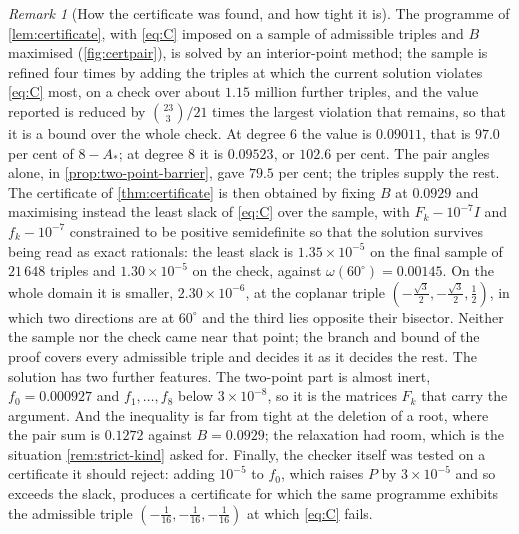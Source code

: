\documentclass[11pt,reqno]{amsart}
\renewcommand{\_}{\origunderscore\allowbreak}
\numberwithin{equation}{section}
\theoremstyle{plain}
\theoremstyle{definition}
\theoremstyle{remark}
\newtheorem{remark}[thm]{Remark}
\begin{document}
\begin{remark}[How the certificate was found, and how tight it is]\label{rem:certificate-found}
The programme of \cref{lem:certificate}, with \eqref{eq:C} imposed on a
sample of admissible triples and $B$ maximised
(\cref{fig:certpair}), is solved by an
interior-point method; the sample is
refined four times by adding the triples at which the current solution
violates \eqref{eq:C} most, on a check over about $1.15$ million further
triples, and the value reported is reduced by $\binom{23}3/21$ times
the largest violation that remains, so that it is a bound over the
whole check. At degree $6$ the value is $0.09011$, that is $97.0$ per
cent of $8-A_*$; at degree $8$ it is $0.09523$, or $102.6$ per cent. The
pair angles alone, in \cref{prop:two-point-barrier}, gave $79.5$ per
cent; the triples supply the rest. The certificate of
\cref{thm:certificate} is then obtained by fixing $B$ at $0.0929$ and
maximising instead the least slack of \eqref{eq:C} over the sample, with
$F_k-10^{-7}I$ and $f_k-10^{-7}$ constrained to be positive
semidefinite so that the solution survives being read as exact
rationals: the least slack is $1.35\times10^{-5}$ on the final sample
of $21\,648$ triples and $1.30\times10^{-5}$ on the check, against
$\omega(60^\circ)=0.00145$. On the whole domain it is smaller,
$2.30\times10^{-6}$, at the coplanar triple
$(-\frac{\sqrt3}2,-\frac{\sqrt3}2,\frac12)$, in which two directions are
at $60^\circ$ and the third lies opposite their bisector. Neither the
sample nor the check came near that point; the branch and bound of the
proof covers every admissible triple and decides it as it decides the
rest. The solution has two further features.
The two-point part is almost inert, $f_0=0.000927$ and
$f_1,\dots,f_8$ below $3\times10^{-8}$, so it is the matrices $F_k$ that
carry the argument. And the inequality is far from tight at the
deletion of a root, where the pair sum is $0.1272$ against
$B=0.0929$; the relaxation had room, which is the situation
\cref{rem:strict-kind} asked for. Finally, the checker itself was tested on a
certificate it should reject: adding $10^{-5}$ to $f_0$, which raises
$P$ by $3\times10^{-5}$ and so exceeds the slack, produces a certificate
for which the same programme exhibits the admissible triple
$(-\tfrac1{16},-\tfrac1{16},-\tfrac1{16})$ at which \eqref{eq:C} fails.
\end{remark}
\end{document}
